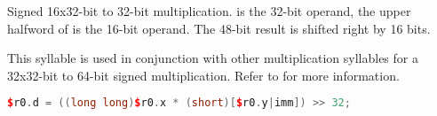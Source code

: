 \noindent Signed 16x32-bit to 32-bit multiplication.  is the 32-bit operand,
the upper halfword of \code{[$r0.y|imm]} is the 16-bit operand. The 48-bit result is
shifted right by 16 bits.

This syllable is used in conjunction with other multiplication syllables for a
32x32-bit to 64-bit signed multiplication. Refer to  for more
information.

\begin{lstlisting}[numbers=none, basicstyle=\ttfamily\footnotesize, language=C++]
$r0.d = ((long long)$r0.x * (short)[$r0.y|imm]) >> 32;
\end{lstlisting}


\vskip 10pt
\noindent\begin{minipage}{\textwidth}
\label{opc:ADDF}
\noindent\textbf{\footnotesize\texttt{}}

\noindent\textbf{\footnotesize\texttt{}}


\end{minipage}
